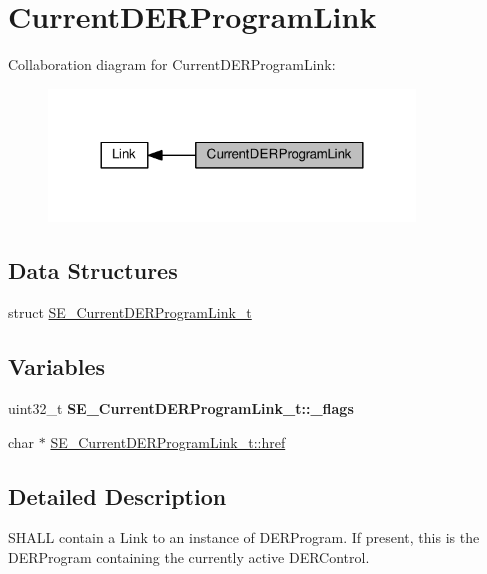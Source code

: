 \hypertarget{group__CurrentDERProgramLink}{}\section{Current\+D\+E\+R\+Program\+Link}
\label{group__CurrentDERProgramLink}
Collaboration diagram for Current\+D\+E\+R\+Program\+Link\+:\nopagebreak
\begin{figure}[H]
\begin{center}
\leavevmode
\includegraphics[width=276pt]{group__CurrentDERProgramLink}
\end{center}
\end{figure}
\subsection*{Data Structures}
\begin{DoxyCompactItemize}
\item 
struct \hyperlink{structSE__CurrentDERProgramLink__t}{S\+E\+\_\+\+Current\+D\+E\+R\+Program\+Link\+\_\+t}
\end{DoxyCompactItemize}
\subsection*{Variables}
\begin{DoxyCompactItemize}
\item 
\mbox{\label{group__CurrentDERProgramLink_ga142e6eb8187fdba847fa986e1cd5533c}} 
uint32\+\_\+t {\bfseries S\+E\+\_\+\+Current\+D\+E\+R\+Program\+Link\+\_\+t\+::\+\_\+flags}
\item 
char $\ast$ \hyperlink{group__CurrentDERProgramLink_ga400d4470ff1d8304328473fce9736eca}{S\+E\+\_\+\+Current\+D\+E\+R\+Program\+Link\+\_\+t\+::href}
\end{DoxyCompactItemize}


\subsection{Detailed Description}
S\+H\+A\+LL contain a Link to an instance of D\+E\+R\+Program. If present, this is the D\+E\+R\+Program containing the currently active D\+E\+R\+Control. 

